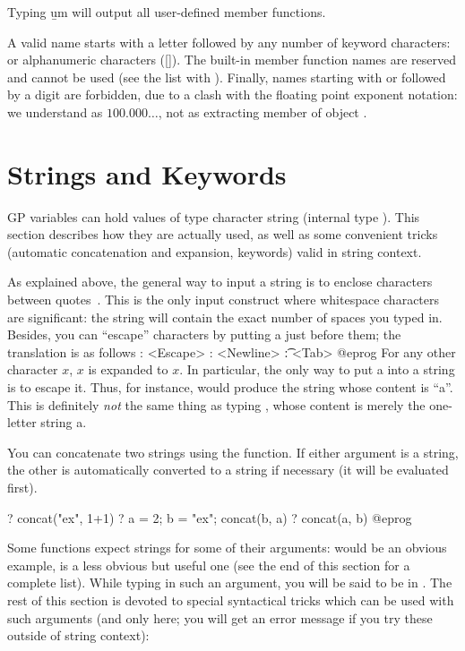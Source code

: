  Typing \b{um} will output all user-defined member functions.

 A valid name starts with a letter followed
by any number of keyword characters: \kbd{\_} or alphanumeric characters
([]). The built-in member function names are reserved and
cannot be used (see the list with ). Finally, names starting with
 or  followed by a digit are forbidden, due to a clash with
the floating point exponent notation: we understand  as
$100.000\dots$, not as extracting member  of object .

\section{Strings and Keywords}
\label{se:strings}

 GP variables can hold values of type character string
(internal type ). This section describes how they are actually used,
as well as some convenient tricks (automatic concatenation and expansion,
keywords) valid in string context.

As explained above, the general way to input a string is to enclose
characters between quotes~. This is the only input construct where
whitespace characters are significant: the string will contain the exact
number of spaces you typed in. Besides, you can ``escape'' characters by
putting a \kbd{\bs} just before them; the translation is as follows
\bprog
   \e: <Escape>
   \n: <Newline>
   \t: <Tab>
@eprog
For any other character $x$, \b{$x$} is expanded to $x$. In particular, the
only way to put a  into a string is to escape it. Thus, for
instance,  would produce the string whose content is
``a''. This is definitely \emph{not} the same thing as typing ,
whose content is merely the one-letter string a.

You can concatenate two strings using the  function. If either
argument is a string, the other is automatically converted to a string if
necessary (it will be evaluated first).

\bprog
? concat("ex", 1+1)
? a = 2; b = "ex"; concat(b, a)
? concat(a, b)
@eprog

Some functions expect strings for some of their arguments:  would
be an obvious example,  is a less obvious but useful one (see the
end of this section for a complete list). While typing in such an argument,
you will be said to be in . The rest of this section is
devoted to special syntactical tricks which can be used with such arguments
(and only here; you will get an error message if you try these outside of
string context):

